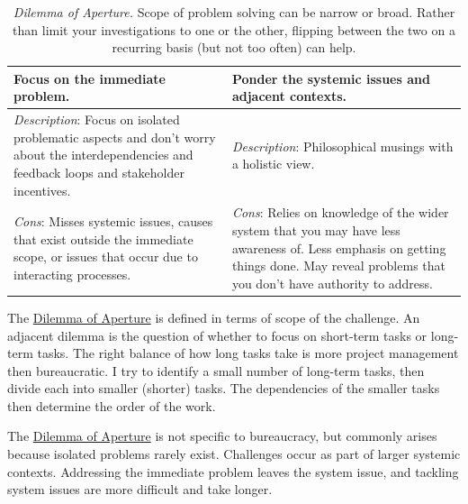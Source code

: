 \begin{center}
\begin{table}[H] %
\begin{tabular}{ | m{\dilemmatablewidth}| m{\dilemmatablewidth} | } 
  \hline
  \textbf{Focus on the immediate problem.} &
  \textbf{Ponder the systemic issues and adjacent contexts.} \\
  \hline
  \textit{Description}: Focus on isolated problematic aspects and don't worry about the interdependencies and feedback loops and stakeholder incentives. &
  \textit{Description}: Philosophical musings with a holistic view. \\
  \hline
  \textit{Cons}: Misses systemic issues, causes that exist outside the immediate scope, or issues that occur due to interacting processes. & 
  \textit{Cons}: Relies on knowledge of the wider system that you may have less awareness of. Less emphasis on getting things done. May reveal problems that you don't have authority to address. \\
  \hline
\end{tabular}
\caption{
\textit{Dilemma of Aperture.}
Scope of problem solving can be narrow or broad. Rather than limit your investigations to one or the other, flipping between the two on a recurring basis (but not too often) can help.
}
\label{table:dilemma-personal-focus-vs-systemic}
\end{table}
\end{center}

The \hyperref[table:dilemma-personal-focus-vs-systemic]{Dilemma of Aperture} is defined in terms of scope of the challenge. An adjacent dilemma is the question of whether to focus on short-term tasks or long-term tasks. The right balance of how long tasks take is more project management then bureaucratic. I try to identify a small number of long-term tasks, then divide each into smaller (shorter) tasks. The dependencies of the smaller tasks then determine the order of the work.

The \hyperref[table:dilemma-personal-focus-vs-systemic]{Dilemma of Aperture} is not specific to bureaucracy, but commonly arises because isolated problems rarely exist. Challenges occur as part of larger systemic contexts. Addressing the immediate problem leaves the system issue, and tackling system issues are more difficult and take longer. 

